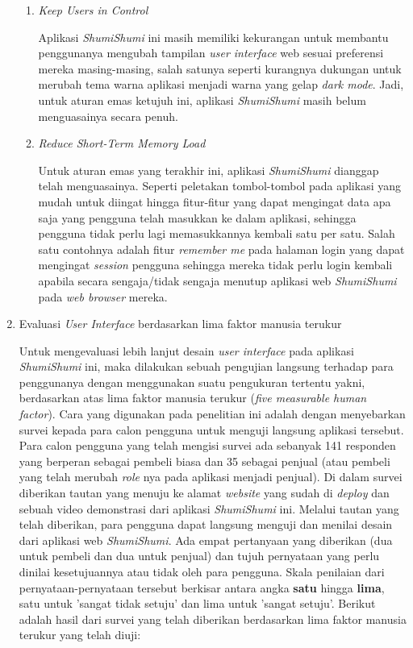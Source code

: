 \documentclass[a4paper]{article}
\begin{document}
\begin{enumerate}
\begin{enumerate}
        \item \textit{Keep Users in Control}
        
        Aplikasi \textit{ShumiShumi} ini masih memiliki kekurangan untuk membantu penggunanya mengubah tampilan \textit{user interface} web sesuai preferensi mereka masing-masing, salah satunya seperti kurangnya dukungan untuk merubah tema warna aplikasi menjadi warna yang gelap \textit{dark mode}. Jadi, untuk aturan emas ketujuh ini, aplikasi \textit{ShumiShumi} masih belum menguasainya secara penuh.

        \item \textit{Reduce Short-Term Memory Load}
        
        Untuk aturan emas yang terakhir ini, aplikasi \textit{ShumiShumi} dianggap telah menguasainya. Seperti peletakan tombol-tombol pada aplikasi yang mudah untuk diingat hingga fitur-fitur yang dapat mengingat data apa saja yang pengguna telah masukkan ke dalam aplikasi, sehingga pengguna tidak perlu lagi memasukkannya kembali satu per satu. Salah satu contohnya adalah fitur \textit{remember me} pada halaman login yang dapat mengingat \textit{session} pengguna sehingga mereka tidak perlu login kembali apabila secara sengaja/tidak sengaja menutup aplikasi web \textit{ShumiShumi} pada \textit{web browser} mereka.

    \end{enumerate}
    \newpage
    \item Evaluasi \textit{User Interface} berdasarkan lima faktor manusia terukur
    
    Untuk mengevaluasi lebih lanjut desain \textit{user interface} pada aplikasi \textit{ShumiShumi} ini, maka dilakukan sebuah pengujian langsung terhadap para penggunanya dengan menggunakan suatu pengukuran tertentu yakni, berdasarkan atas lima faktor manusia terukur (\textit{five measurable human factor}). Cara yang digunakan pada penelitian ini adalah dengan menyebarkan survei kepada para calon pengguna untuk menguji langsung aplikasi tersebut. Para calon pengguna yang telah mengisi survei ada sebanyak 141 responden yang berperan sebagai pembeli biasa dan 35 sebagai penjual (atau pembeli yang telah merubah \textit{role} nya pada aplikasi menjadi penjual). Di dalam survei diberikan tautan yang menuju ke alamat \textit{website} yang sudah di \textit{deploy} dan sebuah video demonstrasi dari aplikasi \textit{ShumiShumi} ini. Melalui tautan yang telah diberikan, para pengguna dapat langsung menguji dan menilai desain dari aplikasi web \textit{ShumiShumi}. Ada empat pertanyaan yang diberikan (dua untuk pembeli dan dua untuk penjual) dan tujuh pernyataan yang perlu dinilai kesetujuannya atau tidak oleh para pengguna. Skala penilaian dari pernyataan-pernyataan tersebut berkisar antara angka \textbf{satu} hingga \textbf{lima}, satu untuk 'sangat tidak setuju' dan lima untuk 'sangat setuju'. Berikut adalah hasil dari survei yang telah diberikan berdasarkan lima faktor manusia terukur yang telah diuji: 


\end{enumerate}
\end{document}

